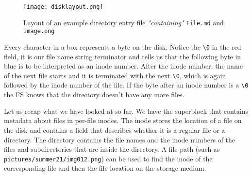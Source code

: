 \begin{figure}[h]
	\texttt{[image: disklayout.png]}
	\caption{Layout of an example directory entry file \textit{"containing"} \texttt{File.md} and \texttt{Image.png}}
	\centering
\end{figure}

Every character in a box represents a byte on the disk. Notice the \texttt{\textbackslash 0} in the red field,
it is our file name string terminator and tells us that the following byte in blue is to be interpreted
as an inode number. After the inode number, the name of the next file starts and it is terminated with the next \texttt{\textbackslash 0}, which is again
followed by the inode number of the file. If the byte after an inode number is a \texttt{\textbackslash 0} the FS knows
that the directory doesn't have any more files.

Let us recap what we have looked at so far.
We have the superblock that contains metadata about files in per-file inodes. The inode stores the
location of a file on the disk and contains a field that describes whether it is a regular file or a
directory. The directory contains the file names and the inode numbers of the files and subdirectories
that are inside the directory. A file path (such as \texttt{pictures/summer21/img012.png}) can
be used to find the inode of the corresponding file and then the file location on the storage medium.

